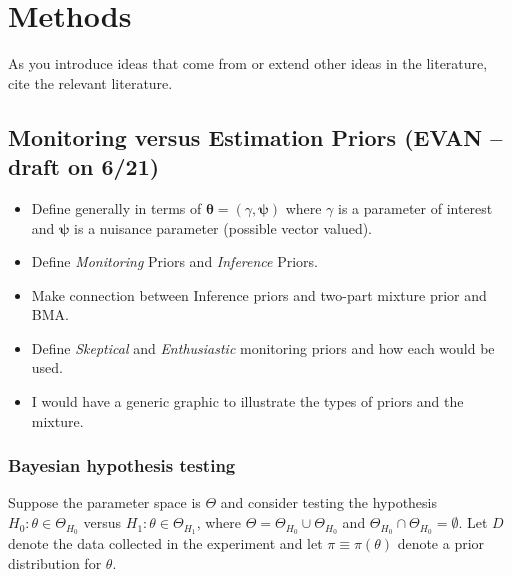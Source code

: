 \documentclass[12pt]{article}
\begin{document}
\section{Methods}

As you introduce ideas that come from or extend other ideas in the literature, cite the relevant literature.

\subsection{Monitoring versus Estimation Priors (EVAN -- draft on 6/21)}

\begin{itemize}
 \item Define generally in terms of $\boldsymbol\theta = \left( \gamma, \boldsymbol\psi  \right)$ where $\gamma$ is a parameter of interest
       and $\boldsymbol\psi$ is a nuisance parameter (possible vector valued).
 \item Define \textit{Monitoring} Priors and \textit{Inference} Priors.
 \item Make connection between Inference priors and two-part mixture prior and BMA.
 \item Define \textit{Skeptical} and \textit{Enthusiastic} monitoring priors and how each would be used.
 \item I would have a generic graphic to illustrate the types of priors and the mixture.
\end{itemize}

\subsubsection{Bayesian hypothesis testing}

Suppose the parameter space is $\Theta$ and consider testing the hypothesis $H_0:\theta\in\Theta_{H_0}$ versus $H_1:\theta\in\Theta_{H_1}$, where $\Theta=\Theta_{H_0}\cup \Theta_{H_0}$ and $\Theta_{H_0}\cap \Theta_{H_0}=\emptyset$. Let $D$ denote the data collected in the experiment and let $\pi\equiv \pi(\theta)$ denote a prior distribution for $\theta$. %
\end{document}
